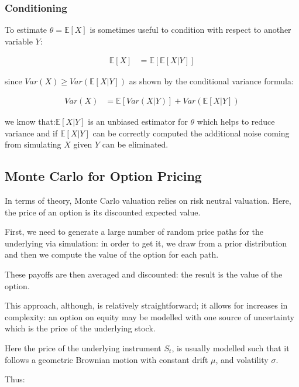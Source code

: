 \documentclass[paper=a4, fontsize=12pt]{scrartcl} %
\numberwithin{equation}{section}
\begin{document}
\subsubsection{Conditioning}
To estimate $\theta = \mathbb{E}[X]$ is sometimes useful to condition with respect to another variable $Y$:

		\begin{equation}	
		\begin{aligned}
			\mathbb{E}[X] &= \mathbb{E}[\mathbb{E}[X|Y]]
		\end{aligned}
		\end{equation}
		
since $Var(X) \geq Var(\mathbb{E}[X|Y])$ as shown by the conditional variance formula:

		\begin{equation}	
		\begin{aligned}
			Var(X) &= \mathbb{E}[Var(X|Y)]+ Var(\mathbb{E}[X|Y])
		\end{aligned}
		\end{equation}

we know that:$\mathbb{E}[X|Y]$ is an unbiased estimator for $\theta$ which helps to reduce variance and if $\mathbb{E}[X|Y]$ can be correctly computed the additional noise coming from simulating $X$ given $Y$ can be eliminated.

\subsection{Monte Carlo for Option Pricing}
In terms of theory, Monte Carlo valuation relies on risk neutral valuation. Here, the price of an option is its discounted expected value. \par
First, we need to generate a large number of random price paths for the underlying via simulation: in order to get it, we draw from a prior distribution and then we compute the value of the option for each path. 	\par
These payoffs are then averaged and discounted: the result is the value of the option.	\par
This approach, although, is relatively straightforward; it allows for increases in complexity: an option on equity may be modelled with one source of uncertainty which is the price of the underlying stock.\par
Here the price of the underlying instrument $S_{t}$, is usually modelled such that it follows a geometric Brownian motion with constant drift $\mu$, and volatility $\sigma$. \par
	Thus: 
	
\end{document}
